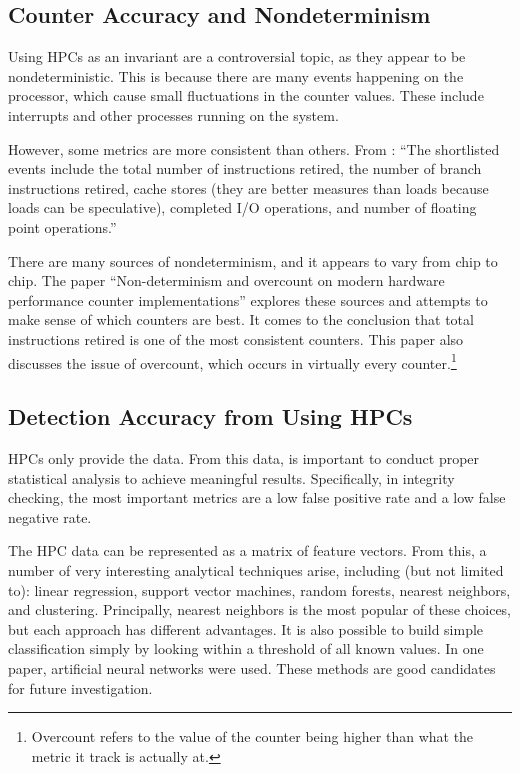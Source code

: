 \documentclass[notitlepage]{article}
\begin{document}
\subsection{Counter Accuracy and Nondeterminism}
Using HPCs as an invariant are a controversial topic, as they appear to be
nondeterministic. This is because there are many events happening on the
processor, which cause small fluctuations in the counter values. These include
interrupts and other processes running on the system.

However, some metrics are more consistent than others. From \cite{arehardware}:
``The shortlisted events include the total number of instructions retired, the
number of branch instructions retired, cache stores (they are better measures
than loads because loads can be speculative), completed I/O operations, and
number of floating point operations.''\cite{arehardware}

There are many sources of nondeterminism, and it appears to vary from chip to
chip. The paper ``Non-determinism and overcount on modern hardware performance
counter implementations'' explores these sources and attempts to make sense of
which counters are best. It comes to the conclusion that total instructions
retired is one of the most consistent counters\cite{overcount}. This paper also
discusses the issue of overcount, which occurs in virtually every
counter.\footnote{Overcount refers to the value of the counter being higher than
what the metric it track is actually at.}

\subsection{Detection Accuracy from Using HPCs}
HPCs only provide the data. From this data, is important to conduct proper
statistical analysis to achieve meaningful results. Specifically, in integrity
checking, the most important metrics are a low false positive rate and a low
false negative rate.

The HPC data can be represented as a matrix of feature vectors.  From this, a
number of very interesting analytical techniques arise, including (but not
limited to): linear regression, support vector machines, random forests, nearest
neighbors, and clustering. Principally, nearest neighbors is the most popular of
these choices, but each approach has different advantages\cite{forsyth}. It is
also possible to build simple classification simply by looking within a
threshold of all known values\cite{numchecker}. In one paper, artificial neural
networks were used\cite{feasibility}. These methods are good candidates for
future investigation.
\end{document}
